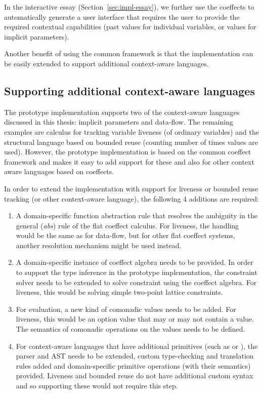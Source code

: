 In the interactive essay (Section~\ref{sec:impl-essay}), we further use the coeffects to
automatically generate a user interface that requires the user to provide the required contextual
capabilities (past values for individual variables, or values for implicit parameters).

Another benefit of using the common framework is that the implementation can be easily extended
to support additional context-aware languages.


\subsection{Supporting additional context-aware languages}
\label{sec:impl-theory-ext}

The prototype implementation supports two of the context-aware languages discussed in this thesis:
implicit parameters and data-flow. The remaining examples are calculus for tracking variable
liveness (of ordinary variables) and the structural language based on bounded reuse (counting
number of times values are used). However, the prototype implementation is based on the
common coeffect framework and makes it easy to add support for these and also for other context
aware languages based on coeffects.

In order to extend the implementation with support for liveness or bounded reuse tracking (or
other context-aware language), the following 4 additions are required:

\begin{enumerate}
\item A domain-specific function abstraction rule that resolves the ambiguity in the general
  (\emph{abs}) rule of the flat coeffect calculus. For liveness, the handling would be the same
  as for data-flow, but for other flat coeffect systems, another resolution mechanism might be used
  instead.

\item A domain-specific instance of coeffect algebra needs to be provided. In order to support
  the type inference in the prototype implementation, the constraint solver needs to be extended
  to solve constraint using the coeffect algebra. For liveness, this would be solving simple
  two-point lattice constraints.

\item For evaluation, a new kind of comonadic values needs to be added. For liveness, this would be
  an option value that may or may not contain a value. The semantics of comonadic operations on the
  values needs to be defined.

\item For context-aware languages that have additional primitives (such as  or ),
  the parser and AST needs to be extended, custom type-checking and translation rules added and
  domain-specific primitive operations (with their semantics) provided. Liveness and bounded reuse
  do not have additional custom syntax and so supporting these would not require this step.
\end{enumerate}

